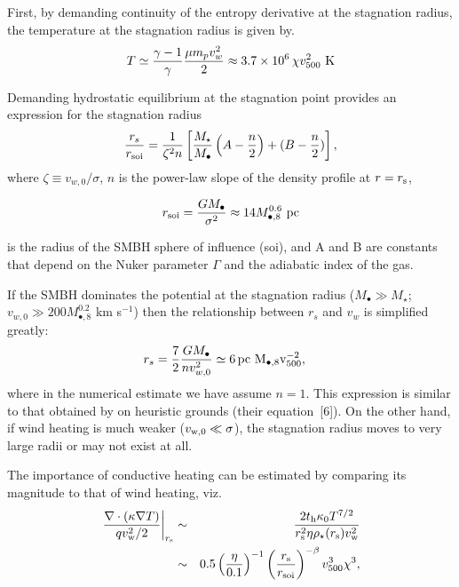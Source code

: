 \documentclass[usenatbib,fleqn]{mn2e}
\newcommand{\rs}{r_s}
\newcommand{\pc}{\rm pc}
\newcommand{\Mstar}{M_{\star}}
\newcommand{\Mbh}[1][]{M_{\bullet#1}}
\newcommand{\Mbheight}{M_{\bullet,8}}
\newcommand{\soi}{\rm soi}
\newcommand{\rsoi}{r_{\soi}}
\newcommand{\vwO}{v_{w,0}}
\newcommand{\x}{\frac{r_s}{\rsoi}}
\begin{document}
First, by demanding continuity of the entropy derivative at the stagnation radius, the temperature at the stagnation radius is given by.
\begin{align}
T \simeq \frac{\gamma-1}{\gamma}\frac{\mu m_p v_{w}^{2}}{2} \approx 3.7
\times 10^6\,\chi v_{500}^2 \,\,{\rm K} 
\label{eq:Tanalytic}
\end{align}

Demanding hydrostatic equilibrium at the stagnation point provides an expression for the stagnation radius
\begin{align}
  \x=\frac{1}{\zeta^2 n}\left[
    \frac{\Mstar}{\Mbh}\left(A-\frac{n}{2}\right)+(B-\frac{n}{2})\right],
  \label{eq:stag_analytic}
\end{align}
where $\zeta \equiv v_{w,0}/\sigma$, $n$ is the power-law slope of the
density profile at $r = r_{\rm s}$,

\begin{align}
r_{\rm soi} = \frac{GM_{\bullet}}{\sigma^{2}} \approx 14M_{\bullet,8}^{0.6}\,\,{\rm pc}
\end{align}

is the radius of the SMBH sphere of
influence (soi), and A and B are constants that depend on the Nuker
parameter $\Gamma$ and the adiabatic index of the gas.

If the SMBH dominates the potential at the stagnation radius
($M_{\bullet} \gg M_{\star}$; $v_{w,0} \gg 200 M_{\bullet,8}^{0.2}$ km
s$^{-1}$) then the relationship between $\rs$ and $v_{w}$ is
simplified greatly:
\begin{align}
  &\rs=\frac{7}{2}\frac{G \Mbh}{n \vwO^2} \simeq 6 \, \pc \,\, \Mbheight v_{500}^{-2},
  \label{eq:stag_simple}
\end{align}
where in the numerical estimate we have assume $n = 1$.  This expression is similar to that obtained by \citet{Volonteri+11} on heuristic grounds (their equation~[6]).  On the other hand, if wind heating is much weaker ($v_{\rm w,0} \ll \sigma$), the stagnation radius moves to very large radii or may not exist at all.  

The importance of conductive heating can be estimated by comparing its
magnitude to that of wind heating, viz.~
\begin{eqnarray} \left.\frac{\nabla\cdot(\kappa \nabla T)}{q v_{\rm
w}^{2}/2}\right|_{r_{\rm s}} &\sim& \frac{2t_{\rm h}\kappa_0
T^{7/2}}{r_{\rm s}^{2}\eta \rho_{\star}(r_{\rm s}) v_{\rm w}^{2}}
\nonumber \\ &\sim&
0.5\left(\frac{\eta}{0.1}\right)^{-1}\left(\frac{r_{\rm s}}{r_{\rm
soi}}\right)^{-\beta} v_{500}^{3}\chi^{3},
\end{eqnarray}
\end{document}
